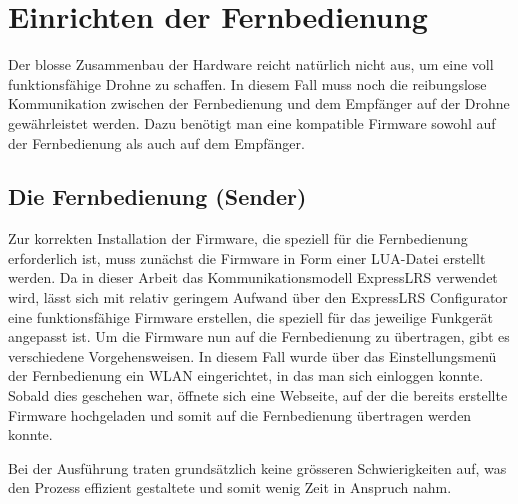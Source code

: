\chapter{Einrichten der Fernbedienung} \label{ch:fernbedieungn}
Der blosse Zusammenbau der Hardware reicht natürlich nicht aus, um eine voll funktionsfähige Drohne zu schaffen. In diesem Fall muss noch die reibungslose Kommunikation zwischen der Fernbedienung und dem Empfänger auf der Drohne gewährleistet werden. Dazu benötigt man eine kompatible Firmware sowohl auf der Fernbedienung als auch auf dem Empfänger.

\section{Die Fernbedienung (Sender)}
Zur korrekten Installation der Firmware, die speziell für die Fernbedienung erforderlich ist, muss zunächst die Firmware in Form einer LUA-Datei erstellt werden. Da in dieser Arbeit das Kommunikationsmodell ExpressLRS verwendet wird, lässt sich mit relativ geringem Aufwand über den ExpressLRS Configurator eine funktionsfähige Firmware erstellen, die speziell für das jeweilige Funkgerät angepasst ist. Um die Firmware nun auf die Fernbedienung zu übertragen, gibt es verschiedene Vorgehensweisen. In diesem Fall wurde über das Einstellungsmenü der Fernbedienung ein WLAN eingerichtet, in das man sich einloggen konnte. Sobald dies geschehen war, öffnete sich eine Webseite, auf der die bereits erstellte Firmware hochgeladen und somit auf die Fernbedienung übertragen werden konnte.

Bei der Ausführung traten grundsätzlich keine grösseren Schwierigkeiten auf, was den Prozess effizient gestaltete und somit wenig Zeit in Anspruch nahm.

